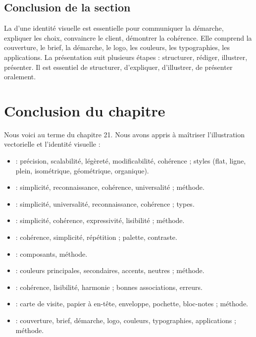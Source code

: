 \subsection*{Conclusion de la section}

La  d'une identité visuelle est essentielle pour communiquer la démarche, expliquer les choix, convaincre le client, démontrer la cohérence. Elle comprend la couverture, le brief, la démarche, le logo, les couleurs, les typographies, les applications. La présentation suit plusieurs étapes : structurer, rédiger, illustrer, présenter. Il est essentiel de structurer, d'expliquer, d'illustrer, de présenter oralement.

\section*{Conclusion du chapitre}

Nous voici au terme du chapitre 21. Nous avons appris à maîtriser l'illustration vectorielle et l'identité visuelle :

\begin{itemize}
    \item {} : précision, scalabilité, légèreté, modificabilité, cohérence ; styles (flat, ligne, plein, isométrique, géométrique, organique).
    \item {} : simplicité, reconnaissance, cohérence, universalité ; méthode.
    \item {} : simplicité, universalité, reconnaissance, cohérence ; types.
    \item {} : simplicité, cohérence, expressivité, lisibilité ; méthode.
    \item {} : cohérence, simplicité, répétition ; palette, contraste.
    \item {} : composants, méthode.
    \item {} : couleurs principales, secondaires, accents, neutres ; méthode.
    \item {} : cohérence, lisibilité, harmonie ; bonnes associations, erreurs.
    \item {} : carte de visite, papier à en-tête, enveloppe, pochette, bloc-notes ; méthode.
    \item {} : couverture, brief, démarche, logo, couleurs, typographies, applications ; méthode.
\end{itemize}

